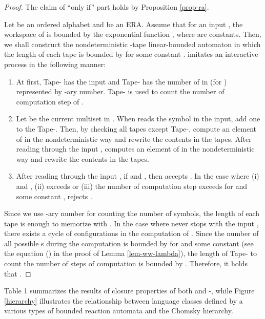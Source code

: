 \documentclass[preprint,fleqn,1p]{elsarticle}
\begin{document}
\begin{proof}
The claim of ``only if'' part holds by Proposition \ref{prop-ra}.

Let  be an ordered alphabet and  be an ERA. Assume that for an input , the workspace of  is bounded by the exponential function , where  are constants. Then, we shall construct the nondeterministic -tape linear-bounded automaton  in which the length of each tape is bounded by  for some constant .   imitates an interactive process  in the following manner:  
\begin{enumerate}
\item At first, Tape- has the input  and Tape- has the number of  in  (for )  represented by -ary number. Tape- is used to count the number of computation step of .
\item Let  be the current multiset in . When  reads the symbol  in the input, add one to the Tape-. Then, by checking all tapes except Tape-, compute an element of  in the nondeterministic way and rewrite the contents in the tapes. After reading through the input ,  computes an element of  in the nondeterministic way and rewrite the contents in the tapes.
\item After reading through the input , if  and , then  accepts . In the case where (i)  and , (ii)  exceeds  or (iii) the number of computation step exceeds  for  and some constant ,  rejects .
\end{enumerate}
Since we use -ary number for counting the number of symbols, the length   of each tape is enough to memorize  with . 
In the case where  never stops with the input , there exists a cycle of configurations in the computation of . Since the number of all possible s during the computation is bounded by  for  and some constant  (see the equation () in the proof of Lemma \ref{lem-ww-lambda}),  the length of Tape- to count the number of steps of computation is bounded by .
Therefore, it holds that .
\end{proof}


Table 1 summarizes the results of closure properties of both 
 and -, while Figure \ref{hierarchy} 
illustrates the relationship between language classes defined by 
a various types of bounded reaction automata and the Chomsky hierarchy.
\end{document}
